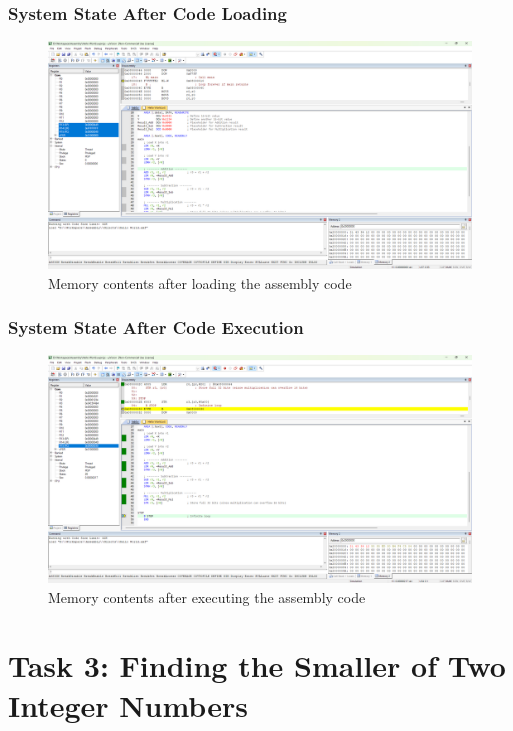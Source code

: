 \documentclass[12pt,a4paper]{article}
\begin{document}
\subsubsection{System State After Code Loading}
\begin{figure}[H]
    \centering
    \includegraphics[width=\textwidth]{ls2.png}
    \caption{Memory contents after loading the assembly code}
    \label{fig:loading2}
\end{figure}

\subsubsection{System State After Code Execution}
\begin{figure}[H]
    \centering
    \includegraphics[width=\textwidth]{es2.png}
    \caption{Memory contents after executing the assembly code}
    \label{fig:execution2}
\end{figure}

\section{Task 3: Finding the Smaller of Two Integer Numbers}
\end{document}
